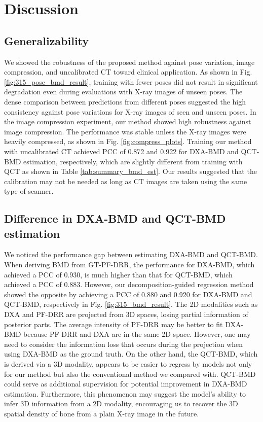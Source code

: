 \documentclass[times,twocolumn,final]{elsarticle}
\begin{document}
\section{Discussion}
\subsection{Generalizability}
We showed the robustness of the proposed method against pose variation, image compression, and uncalibrated CT toward clinical application.
As shown in Fig. \ref{fig:315_pose_bmd_result}, training with fewer poses did not result in significant degradation even during evaluations with X-ray images of unseen poses.
The dense comparison between predictions from different poses suggested the high consistency against pose variations for X-ray images of seen and unseen poses.
In the image compression experiment, our method showed high robustness against image compression.
The performance was stable unless the X-ray images were heavily compressed, as shown in Fig. \ref{fig:compress_plots}.
Training our method with uncalibrated CT achieved PCC of 0.872 and 0.922 for DXA-BMD and QCT-BMD estimation, respectively, which are slightly different from training with QCT as shown in Table \ref{tab:summary_bmd_est}.
Our results suggested that the calibration may not be needed as long as CT images are taken using the same type of scanner.

\subsection{Difference in DXA-BMD and QCT-BMD estimation}
We noticed the performance gap between estimating DXA-BMD and QCT-BMD.
When deriving BMD from GT-PF-DRR, the performance for DXA-BMD, which achieved a PCC of 0.930, is much higher than that for QCT-BMD, which achieved a PCC of 0.883.
However, our decomposition-guided regression method showed the opposite by achieving a PCC of 0.880 and 0.920 for DXA-BMD and QCT-BMD, respectively in Fig. \ref{fig:315_bmd_result}.
The 2D modalities such as DXA and PF-DRR are projected from 3D spaces, losing partial information of posterior parts.
The average intensity of PF-DRR may be better to fit DXA-BMD because PF-DRR and DXA are in the same 2D space.
However, one may need to consider the information loss that occurs during the projection when using DXA-BMD as the ground truth.
On the other hand, the QCT-BMD, which is derived via a 3D modality, appears to be easier to regress by models not only for our method but also the conventional method we compared with.
QCT-BMD could serve as additional supervision for potential improvement in DXA-BMD estimation.
Furthermore, this phenomenon may suggest the model's ability to infer 3D information from a 2D modality, encouraging us to recover the 3D spatial density of bone from a plain X-ray image in the future.
\end{document}
